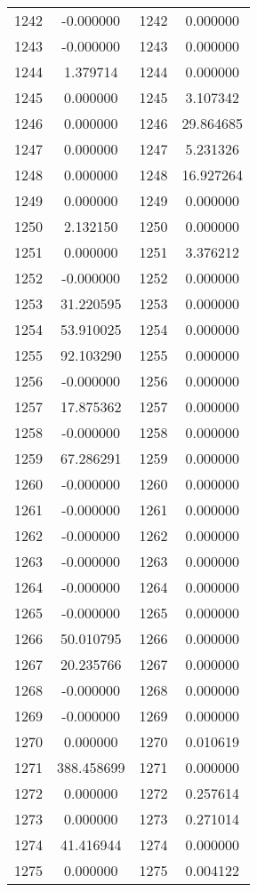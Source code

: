 \documentclass[12pt]{article}
\begin{document}
\begin{longtable}{@{}cccc@{}}
1242 & -0.000000 & 1242 & 0.000000 \\
1243 & -0.000000 & 1243 & 0.000000 \\
1244 & 1.379714 & 1244 & 0.000000 \\
1245 & 0.000000 & 1245 & 3.107342 \\
1246 & 0.000000 & 1246 & 29.864685 \\
1247 & 0.000000 & 1247 & 5.231326 \\
1248 & 0.000000 & 1248 & 16.927264 \\
1249 & 0.000000 & 1249 & 0.000000 \\
1250 & 2.132150 & 1250 & 0.000000 \\
1251 & 0.000000 & 1251 & 3.376212 \\
1252 & -0.000000 & 1252 & 0.000000 \\
1253 & 31.220595 & 1253 & 0.000000 \\
1254 & 53.910025 & 1254 & 0.000000 \\
1255 & 92.103290 & 1255 & 0.000000 \\
1256 & -0.000000 & 1256 & 0.000000 \\
1257 & 17.875362 & 1257 & 0.000000 \\
1258 & -0.000000 & 1258 & 0.000000 \\
1259 & 67.286291 & 1259 & 0.000000 \\
1260 & -0.000000 & 1260 & 0.000000 \\
1261 & -0.000000 & 1261 & 0.000000 \\
1262 & -0.000000 & 1262 & 0.000000 \\
1263 & -0.000000 & 1263 & 0.000000 \\
1264 & -0.000000 & 1264 & 0.000000 \\
1265 & -0.000000 & 1265 & 0.000000 \\
1266 & 50.010795 & 1266 & 0.000000 \\
1267 & 20.235766 & 1267 & 0.000000 \\
1268 & -0.000000 & 1268 & 0.000000 \\
1269 & -0.000000 & 1269 & 0.000000 \\
1270 & 0.000000 & 1270 & 0.010619 \\
1271 & 388.458699 & 1271 & 0.000000 \\
1272 & 0.000000 & 1272 & 0.257614 \\
1273 & 0.000000 & 1273 & 0.271014 \\
1274 & 41.416944 & 1274 & 0.000000 \\
1275 & 0.000000 & 1275 & 0.004122 \\

\end{longtable}
\end{document}
